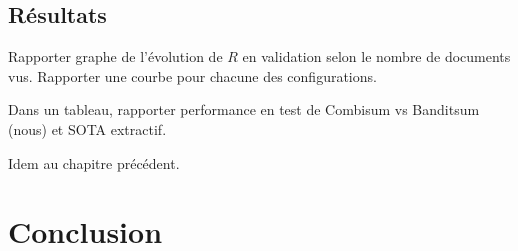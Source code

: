 \subsection{Résultats}

Rapporter graphe de l'évolution de $R$ en validation selon le nombre de documents vus.
Rapporter une courbe pour chacune des configurations.

Dans un tableau, rapporter performance en test de Combisum vs Banditsum (nous) et
SOTA extractif.

Idem au chapitre précédent.

\section{Conclusion}


